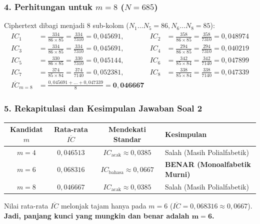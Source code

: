 \documentclass[11pt,a4paper]{article}
\begin{document}
\subsubsection*{4. Perhitungan untuk $m = 8$ ($N = 685$)}
Ciphertext dibagi menjadi 8 sub-kolom ($N_1 \dots N_5 = 86, N_6 \dots N_8 = 85$):
\begin{align*}
IC_1 &= \frac{334}{86 \times 85} = \frac{334}{7310} = 0{,}045691, \quad &
IC_2 &= \frac{358}{86 \times 85} = \frac{358}{7310} = 0{,}048974 \\
IC_3 &= \frac{334}{86 \times 85} = \frac{334}{7310} = 0{,}045691, \quad &
IC_4 &= \frac{294}{86 \times 85} = \frac{294}{7310} = 0{,}040219 \\
IC_5 &= \frac{330}{86 \times 85} = \frac{330}{7310} = 0{,}045144, \quad &
IC_6 &= \frac{342}{85 \times 84} = \frac{342}{7140} = 0{,}047899 \\
IC_7 &= \frac{374}{85 \times 84} = \frac{374}{7140} = 0{,}052381, \quad &
IC_8 &= \frac{338}{85 \times 84} = \frac{338}{7140} = 0{,}047339 \\[0.2cm]
\overline{IC}_{m=8} &= \frac{0{,}045691 + \dots + 0{,}047339}{8} = \mathbf{0{,}046667}
\end{align*}

\subsubsection*{5. Rekapitulasi dan Kesimpulan Jawaban Soal 2}
\begin{table}[h!]
\centering
\begin{tabular}{c c c l}
\toprule
\textbf{Kandidat $m$} & \textbf{Rata-rata $\overline{IC}$} & \textbf{Mendekati Standar} & \textbf{Kesimpulan} \\
\midrule
$m = 4$ & $0{,}046513$ & $IC_{\text{acak}} \approx 0{,}0385$ & Salah (Masih Polialfabetik) \\
\textbf{$m = 6$} & \textbf{$0{,}068316$} & \textbf{$IC_{\text{bahasa}} \approx 0{,}0667$} & \textbf{BENAR (Monoalfabetik Murni)} \\
$m = 8$ & $0{,}046667$ & $IC_{\text{acak}} \approx 0{,}0385$ & Salah (Masih Polialfabetik) \\
\bottomrule
\end{tabular}
\end{table}

\begin{tcolorbox}
Nilai rata-rata $\overline{IC}$ melonjak tajam hanya pada $m=6$ ($\overline{IC} = 0{,}068316 \approx 0{,}0667$).\\
\textbf{Jadi, panjang kunci yang mungkin dan benar adalah $\mathbf{m = 6}$.}
\end{tcolorbox}
\end{document}
